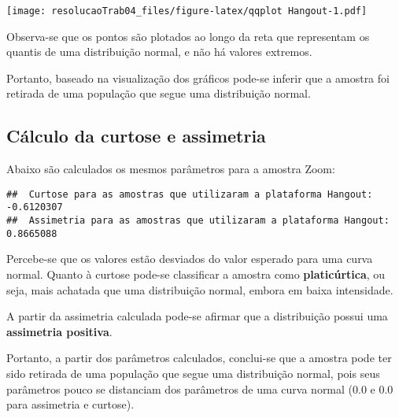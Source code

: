 \documentclass[
]{article}
\newenvironment{Shaded}{\begin{snugshade}}{\end{snugshade}}
\newcommand{\CharTok}[1]{\textcolor[rgb]{0.31,0.60,0.02}{#1}}
\newcommand{\KeywordTok}[1]{\textcolor[rgb]{0.13,0.29,0.53}{\textbf{#1}}}
\newcommand{\NormalTok}[1]{#1}
\newcommand{\OperatorTok}[1]{\textcolor[rgb]{0.81,0.36,0.00}{\textbf{#1}}}
\newcommand{\StringTok}[1]{\textcolor[rgb]{0.31,0.60,0.02}{#1}}
\begin{document}
\texttt{[image: resolucaoTrab04\_files/figure-latex/qqplot Hangout-1.pdf]}

Observa-se que os pontos são plotados ao longo da reta que representam
os quantis de uma distribuição normal, e não há valores extremos.

Portanto, baseado na visualização dos gráficos pode-se inferir que a
amostra foi retirada de uma população que segue uma distribuição normal.

\hypertarget{cuxe1lculo-da-curtose-e-assimetria-1}{%
\subsection{Cálculo da curtose e
assimetria}\label{cuxe1lculo-da-curtose-e-assimetria-1}}

Abaixo são calculados os mesmos parâmetros para a amostra Zoom:

\begin{Shaded}
\end{Shaded}

\begin{verbatim}
##  Curtose para as amostras que utilizaram a plataforma Hangout:  -0.6120307 
##  Assimetria para as amostras que utilizaram a plataforma Hangout:  0.8665088
\end{verbatim}

Percebe-se que os valores estão desviados do valor esperado para uma
curva normal. Quanto à curtose pode-se classificar a amostra como
\textbf{platicúrtica}, ou seja, mais achatada que uma distribuição
normal, embora em baixa intensidade.

A partir da assimetria calculada pode-se afirmar que a distribuição
possui uma \textbf{assimetria positiva}.

Portanto, a partir dos parâmetros calculados, conclui-se que a amostra
pode ter sido retirada de uma população que segue uma distribuição
normal, pois seus parâmetros pouco se distanciam dos parâmetros de uma
curva normal (0.0 e 0.0 para assimetria e curtose).
\end{document}
